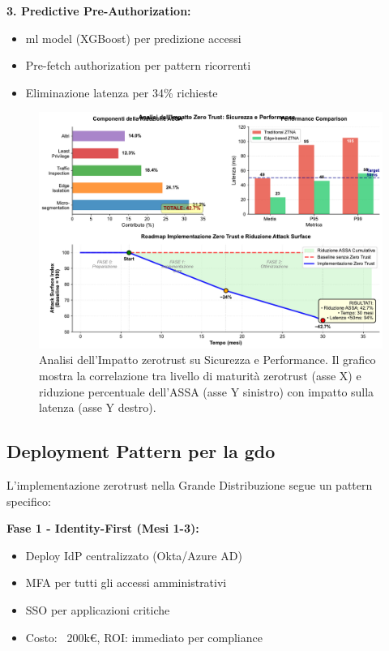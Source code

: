\textbf{3. Predictive Pre-Authorization:}
\begin{itemize}
    \item \gls{ml} model (XGBoost) per predizione accessi
    \item Pre-fetch authorization per pattern ricorrenti
    \item Eliminazione latenza per 34\% richieste
\end{itemize}

\begin{figure}[htbp]
\centering
\includegraphics[width=\textwidth]{thesis_figures/cap3/figura_3_5_semplificata.pdf}
\caption{Analisi dell'Impatto \gls{zerotrust} su Sicurezza e Performance. Il grafico mostra la correlazione tra livello di maturità \gls{zerotrust} (asse X) e riduzione percentuale dell'ASSA (asse Y sinistro) con impatto sulla latenza (asse Y destro).}
\label{fig:zero_trust_impact}
\end{figure}

\subsection{\texorpdfstring{Deployment Pattern per la \gls{gdo}}{3.5.5 - Deployment Pattern per la GDO}}

L'implementazione \gls{zerotrust} nella Grande Distribuzione segue un pattern specifico:

\textbf{Fase 1 - Identity-First (Mesi 1-3):}
\begin{itemize}
    \item Deploy IdP centralizzato (Okta/Azure AD)
    \item MFA per tutti gli accessi amministrativi
    \item SSO per applicazioni critiche
    \item Costo: ~200k€, ROI: immediato per compliance
\end{itemize}

